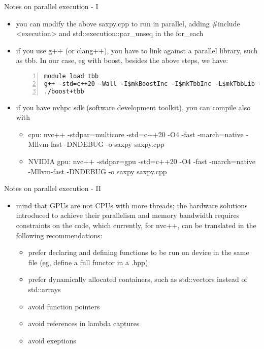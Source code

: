 \documentclass[10pt,aspectratio=169]{beamer}
\begin{document}
\begin{frame}[fragile]{Notes on parallel execution - I}
\begin{itemize}
    \item you can modify the above saxpy.cpp to run in parallel, adding {\ttfamily \#include <execution>} and {\ttfamily std::execution::par\_unseq} in the {\ttfamily for\_each}
    \item if you use g++ (or clang++), you have to link against a parallel library, such as tbb. In our case, eg with boost, besides the above steps, we have:
    \begin{lstlisting}[frame=single, style=cpp, firstnumber=1, numbers=left, numberstyle=\tiny,showtabs=false,xleftmargin=.05\linewidth,xrightmargin=.025\linewidth]
module load tbb
g++ -std=c++20 -Wall -I$mkBoostInc -I$mkTbbInc -L$mkTbbLib -ltbb -DUSE_BOOST saxpy.cpp -o boost+tbb
./boost+tbb
\end{lstlisting}
\item if you have nvhpc sdk (software development toolkit), you can compile also with
\begin{itemize}
    \item cpu: {\ttfamily nvc++ -stdpar=multicore -std=c++20 -O4 -fast -march=native -Mllvm-fast -DNDEBUG -o saxpy saxpy.cpp}
    \item NVIDIA gpu: {\ttfamily nvc++ -stdpar=gpu -std=c++20 -O4 -fast -march=native -Mllvm-fast -DNDEBUG -o saxpy saxpy.cpp}
\end{itemize}
\end{itemize}
\end{frame}

\begin{frame}[fragile]{Notes on parallel execution - II}
\begin{itemize}
\item mind that GPUs are not CPUs with more threads; the hardware solutions introduced to achieve their parallelism and memory bandwidth requires constraints on the code, which currently, for nvc++, can be translated in the following recommendations:
\begin{itemize}
    \item prefer declaring and defining functions to be run on device in the same file (eg, define a full functor in a .hpp)
    \item prefer dynamically allocated containers, such as std::vectors instead of std::arrays
    \item avoid function pointers
    \item avoid references in lambda captures
    \item avoid exeptions
\end{itemize}
\end{itemize}
\end{frame}
\end{document}
